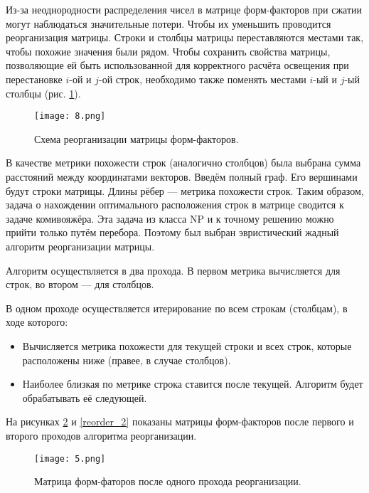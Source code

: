 \documentclass[12pt,fleqn]{article}
\begin{document}
Из-за неоднородности распределения чисел в матрице форм-факторов при сжатии могут наблюдаться значительные потери. Чтобы их уменьшить проводится реорганизация матрицы. Строки и столбцы матрицы переставляются местами так, чтобы похожие значения были рядом. Чтобы сохранить свойства матрицы, позволяющие ей быть использованной для корректного расчёта освещения при перестановке $i$-ой и $j$-ой строк, необходимо также поменять местами $i$-ый и $j$-ый столбцы (рис. \ref{reorder_scheme}).

\begin{figure}[htb]
    \centering
    \texttt{[image: 8.png]}
    \caption{Схема реорганизации матрицы форм-факторов.}
    \label{reorder_scheme}
\end{figure}

В качестве метрики похожести строк (аналогично столбцов) была выбрана сумма расстояний между координатами векторов. Введём полный граф. Его вершинами будут строки матрицы. Длины рёбер --- метрика похожести строк. Таким образом, задача о нахождении оптимального расположения строк в матрице сводится к задаче комивояжёра. Эта задача из класса NP и к точному решению можно прийти только путём перебора. Поэтому был выбран эвристический жадный алгоритм реорганизации матрицы.

Алгоритм осуществляется в два прохода. В первом метрика вычисляется для строк, во втором --- для столбцов.

В одном проходе осуществляется итерирование по всем строкам (столбцам), в ходе которого:

\begin{itemize}

\item Вычисляется метрика похожести для текущей строки и всех строк, которые расположены ниже (правее, в случае столбцов).

\item Наиболее близкая по метрике строка ставится после текущей. Алгоритм будет обрабатывать её следующей.

\end{itemize}

На рисунках \ref{reorder_1} и \ref{reorder_2} показаны матрицы форм-факторов после первого и второго проходов алгоритма реорганизации.

\begin{figure}[htb]
    \centering
    \texttt{[image: 5.png]}
    \caption{Матрица форм-фаторов после одного прохода реорганизации.}
    \label{reorder_1}
\end{figure}
\end{document}
